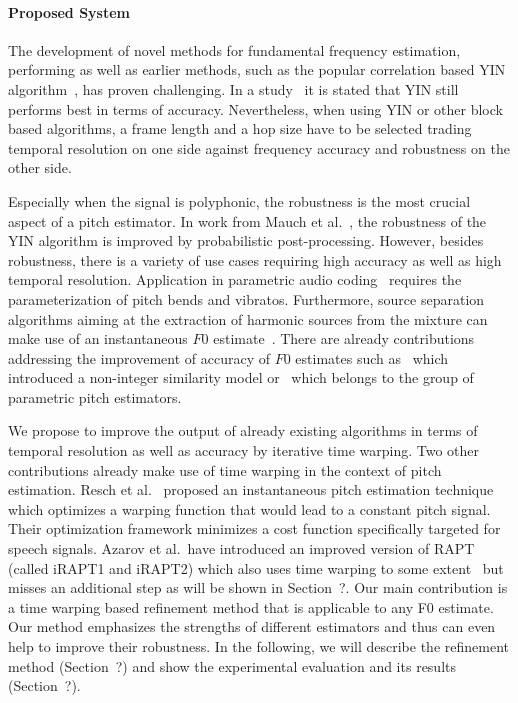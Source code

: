 \paragraph{Proposed System}
%
The development of novel methods for fundamental frequency estimation, performing as well as earlier methods, such as the popular correlation based \textsc{YIN} algorithm~\cite{decheveigne02}, has proven challenging.
In a study~\cite{babacan13} it is stated that YIN still performs best in terms of accuracy.
Nevertheless, when using YIN or other block based algorithms, a frame length and a hop size have to be selected trading temporal resolution on one side against frequency accuracy and robustness on the other side.

Especially when the signal is polyphonic, the robustness is the most crucial aspect of a pitch estimator. In work from Mauch et al.~\cite{mauch14}, the robustness of the \textsc{YIN} algorithm is improved by probabilistic post-processing. However, besides robustness, there is a variety of use cases requiring high accuracy as well as high temporal resolution. Application in parametric audio coding~\cite{purnhagen00} requires the parameterization of pitch bends and vibratos. Furthermore, source separation algorithms aiming at the extraction of harmonic sources from the mixture can make use of an instantaneous $F0$ estimate~\cite{virtanen08, stoter14}. There are already contributions addressing the improvement of accuracy of $F0$ estimates such as~\cite{medan91} which introduced a non-integer similarity model or~\cite{christensen07} which belongs to the group of parametric pitch estimators.

We propose to improve the output of already existing algorithms in terms of temporal resolution as well as accuracy by iterative time warping. Two other contributions already make use of time warping in the context of pitch estimation. Resch et al.~\cite{resch07} proposed an instantaneous pitch estimation technique which optimizes a warping function that would lead to a constant pitch signal. Their optimization framework minimizes a cost function specifically targeted for speech signals. Azarov et al.\ have introduced an improved version of RAPT (called iRAPT1 and iRAPT2) which also uses time warping to some extent~\cite{azarov12} but misses an additional step as will be shown in Section~?.
Our main contribution is a time warping based refinement method that is applicable to any F0 estimate. Our method emphasizes the strengths of different estimators and thus can even help to improve their robustness. In the following, we will describe the refinement method (Section~?) and show the experimental evaluation and its results (Section~?).

